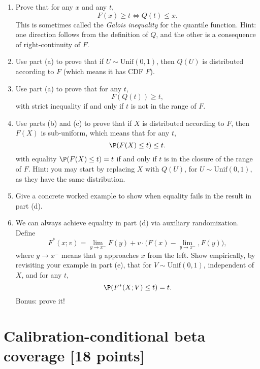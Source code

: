 \documentclass{article}
\begin{document}
\begin{enumerate}[label=(\alph*)]
\item Prove that for any $x$ and any $t$, 
  \marginpar{\small [3 pts]}
  \[
  F(x) \geq t \iff Q(t) \leq x.
  \]
  This is sometimes called the \emph{Galois inequality} for the quantile
  function. Hint: one direction follows from the definition of $Q$, and the
  other is a consequence of right-continuity of $F$.  

\item Use part (a) to prove that if $U \sim \mathrm{Unif}(0,1)$, then $Q(U)$ is
  distributed according to $F$ (which means it has CDF $F$).
  \marginpar{\small [2 pts]}

\item Use part (a) to prove that for any $t$, 
  \marginpar{\small [2 pts]}
  \[
  F(Q(t)) \geq t,
  \]
  with strict inequality if and only if $t$ is not in the range of $F$. 

\item Use parts (b) and (c) to prove that if $X$ is distributed according to
  $F$, then $F(X)$ is sub-uniform, which means that for any $t$, 
  \marginpar{\small [3 pts]}
  \[
  \P(F(X) \leq t) \leq t.
  \]
  with equality $\P(F(X) \leq t) = t$ if and only if $t$ is in the closure of
  the range of $F$. Hint: you may start by replacing $X$ with $Q(U)$, for $U
  \sim \mathrm{Unif}(0,1)$, as they have the same distribution.  
  
\item Give a concrete worked example to show when equality fails in the result  
  in part (d).
  \marginpar{\small [1 pt]}

\item We can always achieve equality in part (d) via auxiliary randomization.
  Define
  \[
  F^*(x; v) =  \lim_{y \to x^-} F(y) + v \cdot \Big( F(x) - \lim_{y \to x^-},
  F(y) \Big),
  \]
  where $y \to x^-$ means that $y$ approaches $x$ from the left. Show
  empirically, by revisiting your example in part (e), that for $V \sim
  \mathrm{Unif}(0,1)$, independent of $X$, and for any $t$,      
  \marginpar{\small [1 pt]}
  \[
  \P(F^*(X; V) \leq t) = t.
  \]
  Bonus: prove it!
\end{enumerate}

\section{Calibration-conditional beta coverage [18 points]}

\def\hC{\hat{C}}
\end{document}

